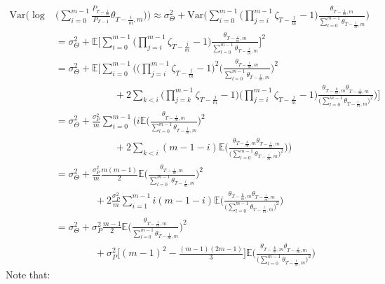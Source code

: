 \begin{align*}
\mathrm{Var}\Bigg(\log &\Bigg(\sum_{i=0}^{m-1} \frac{P_{T-\frac{i}{m}}}{P_{T-1}} \theta_{T-\frac{i}{m},m} \Bigg) \Bigg)
\approx \sigma^2_{\Theta} + \mathrm{Var}\Bigg( \sum_{i=0}^{m-1} \Big(\prod_{j=i}^{m-1} \zeta_{T-\frac{j}{m}}   -1\Big) \frac{\theta_{T-\frac{i}{m},m}}{\sum_{l=0}^{m-1} \theta_{T-\frac{l}{m},m}} \Bigg) \\
&= \sigma^2_{\Theta} + \mathbb{E}\Bigg[ \sum_{i=0}^{m-1} \Big(\prod_{j=i}^{m-1} \zeta_{T-\frac{j}{m}}   -1\Big) \frac{\theta_{T-\frac{i}{m},m}}{\sum_{l=0}^{m-1} \theta_{T-\frac{l}{m},m}} \Bigg]^2 \\
&= \sigma^2_{\Theta} + \mathbb{E}\Bigg[ \sum_{i=0}^{m-1} \Bigg( \Big(\prod_{j=i}^{m-1} \zeta_{T-\frac{j}{m}}   -1\Big)^2 \Bigg(\frac{\theta_{T-\frac{i}{m},m}}{\sum_{l=0}^{m-1} \theta_{T-\frac{l}{m},m}} \Bigg)^2 \\
& \qquad \qquad \qquad + 2 \sum_{k<i} \Big(\prod_{j=k}^{m-1} \zeta_{T-\frac{j}{m}}   -1\Big) \Big(\prod_{j=i}^{m-1} \zeta_{T-\frac{j}{m}}   -1\Big) \frac{\theta_{T-\frac{k}{m},m} \theta_{T-\frac{i}{m},m}}{\Big( \sum_{l=0}^{m-1} \theta_{T-\frac{l}{m},m} \Big)^2}  \Bigg) \Bigg] \\
&= \sigma^2_{\Theta} + \frac{\sigma^2_P}{m} \sum_{i=0}^{m-1} \Bigg( i\mathbb{E} \Bigg(\frac{\theta_{T-\frac{i}{m},m}}{\sum_{l=0}^{m-1} \theta_{T-\frac{l}{m},m}} \Bigg)^2  \\
& \qquad \qquad \qquad+ 2 \sum_{k<i} (m-1-i)\mathbb{E}\Bigg( \frac{\theta_{T-\frac{k}{m},m} \theta_{T-\frac{i}{m},m}}{\Big( \sum_{l=0}^{m-1} \theta_{T-\frac{l}{m},m} \Big)^2} \Bigg) \Bigg)  \\
&= \sigma^2_{\Theta} + \frac{\sigma^2_P}{m} \frac{m(m-1)}{2}\mathbb{E} \Bigg(\frac{\theta_{T-\frac{i}{m},m}}{\sum_{l=0}^{m-1} \theta_{T-\frac{l}{m},m}} \Bigg)^2 \\
& \qquad \qquad + 2  \frac{\sigma^2_P}{m} \sum_{i=1}^{m-1} i (m-1-i)\mathbb{E}\Bigg( \frac{\theta_{T-\frac{k}{m},m} \theta_{T-\frac{i}{m},m}}{\Big( \sum_{l=0}^{m-1} \theta_{T-\frac{l}{m},m} \Big)^2} \Bigg)  \\
&= \sigma^2_{\Theta} + \sigma^2_P \frac{m-1}{2}\mathbb{E} \Bigg(\frac{\theta_{T-\frac{i}{m},m}}{\sum_{l=0}^{m-1} \theta_{T-\frac{l}{m},m}} \Bigg)^2 \\
& \qquad \qquad +   \sigma^2_P\Bigg[ (m-1)^2 - \frac{(m-1)(2m-1)}{3} \Bigg]\mathbb{E}\Bigg( \frac{\theta_{T-\frac{k}{m},m} \theta_{T-\frac{i}{m},m}}{\Big( \sum_{l=0}^{m-1} \theta_{T-\frac{l}{m},m} \Big)^2} \Bigg) 
\end{align*}
Note that:
